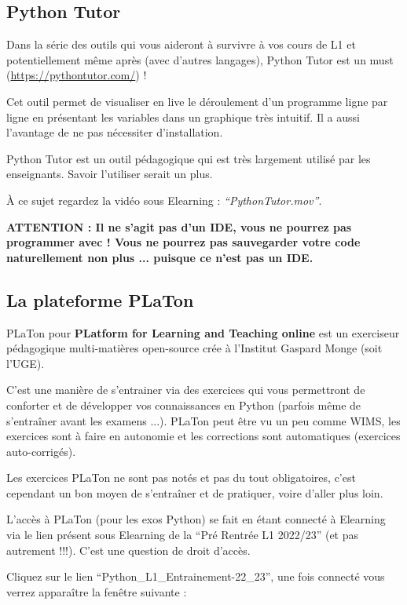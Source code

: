 \documentclass{article}
\begin{document}
\subsection{Python Tutor}

Dans la série des outils qui vous aideront à survivre à vos cours de L1 et potentiellement même après (avec d'autres langages), 
Python Tutor est un must (\url{https://pythontutor.com/}) ! 

Cet outil permet de visualiser en live le déroulement d'un programme ligne par ligne en présentant les variables dans un graphique très intuitif. Il a aussi l'avantage de ne pas nécessiter d'installation. 

Python Tutor est un outil pédagogique qui est très largement utilisé par les enseignants. Savoir l'utiliser serait un plus. 

À ce sujet regardez la vidéo sous Elearning : \emph{``PythonTutor.mov''}.

\textbf{ATTENTION : Il ne s'agit pas d'un IDE, vous ne pourrez pas programmer avec ! Vous ne pourrez pas sauvegarder votre code naturellement non plus ... puisque ce n'est pas un IDE.}

\subsection{La plateforme PLaTon}

PLaTon pour \textbf{PLatform for Learning and Teaching online} est un exerciseur pédagogique multi-matières open-source crée à l'Institut Gaspard Monge (soit l'UGE). 

C'est une manière de s'entrainer via des exercices qui vous permettront de conforter et de développer vos connaissances en Python (parfois même de s'entraîner avant les examens ...). PLaTon peut être vu un peu comme WIMS, les exercices sont à faire en autonomie et les corrections sont automatiques (exercices auto-corrigés).

Les exercices PLaTon ne sont pas notés et pas du tout obligatoires, c'est cependant un bon moyen de s'entraîner et de pratiquer, voire d'aller plus loin. 

L'accès à PLaTon (pour les exos Python) se fait en étant connecté à Elearning via le lien présent sous Elearning de la ``Pré Rentrée L1 2022/23'' (et pas autrement !!!). C'est une question de droit d'accès. 

Cliquez sur le lien ``Python\_L1\_Entrainement-22\_23'', une fois connecté vous verrez apparaître la fenêtre suivante : 
\end{document}
